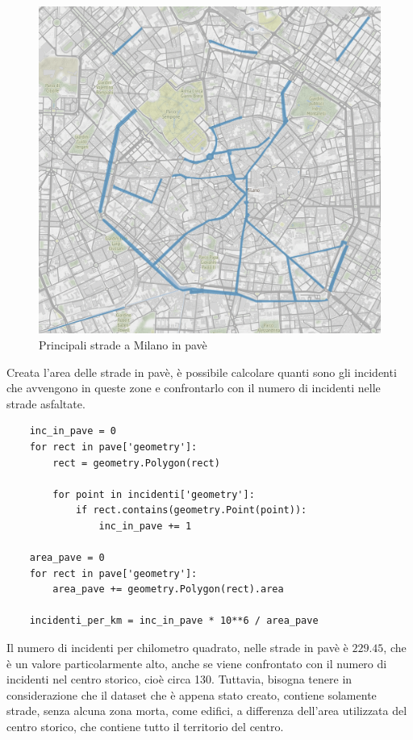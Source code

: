 \documentclass[a4paper]{report}
\begin{document}
\begin{figure}
    \includegraphics[width=\linewidth]{../src/pave/mappa_pave.png}
    \caption{Principali strade a Milano in pavè}
    \label{fig:mappa-pave}
\end{figure}

Creata l'area delle strade in pavè, è possibile calcolare quanti sono gli incidenti che 
avvengono in queste zone e confrontarlo con il numero di incidenti nelle strade asfaltate.

\begin{lstlisting}
    inc_in_pave = 0
    for rect in pave['geometry']: 
        rect = geometry.Polygon(rect)

        for point in incidenti['geometry']: 
            if rect.contains(geometry.Point(point)): 
                inc_in_pave += 1

    area_pave = 0
    for rect in pave['geometry']: 
        area_pave += geometry.Polygon(rect).area

    incidenti_per_km = inc_in_pave * 10**6 / area_pave
\end{lstlisting}

Il numero di incidenti per chilometro quadrato, nelle strade in pavè è  $229.45$, che è un valore 
particolarmente alto, anche se viene confrontato con il numero di incidenti nel centro storico, cioè circa 130.
Tuttavia, bisogna tenere in considerazione che il dataset che è appena stato creato, contiene solamente 
strade, senza alcuna zona morta, come edifici, a differenza dell'area utilizzata del centro storico, 
che contiene tutto il territorio del centro.
\end{document}
